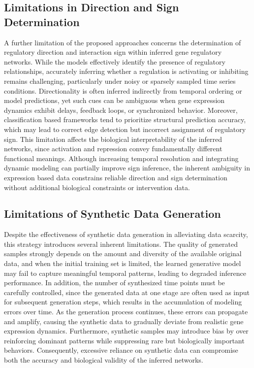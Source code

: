 \subsection{Limitations in Direction and Sign Determination}
A further limitation of the proposed approaches concerns the determination of regulatory direction and interaction sign within inferred gene regulatory networks. While the models effectively identify the presence of regulatory relationships, accurately inferring whether a regulation is activating or inhibiting remains challenging, particularly under noisy or sparsely sampled time series conditions. Directionality is often inferred indirectly from temporal ordering or model predictions, yet such cues can be ambiguous when gene expression dynamics exhibit delays, feedback loops, or synchronized behavior. Moreover, classification based frameworks tend to prioritize structural prediction accuracy, which may lead to correct edge detection but incorrect assignment of regulatory sign. This limitation affects the biological interpretability of the inferred networks, since activation and repression convey fundamentally different functional meanings. Although increasing temporal resolution and integrating dynamic modeling can partially improve sign inference, the inherent ambiguity in expression based data constrains reliable direction and sign determination without additional biological constraints or intervention data.
\subsection{Limitations of Synthetic Data Generation}
Despite the effectiveness of synthetic data generation in alleviating data scarcity, this strategy introduces several inherent limitations. The quality of generated samples strongly depends on the amount and diversity of the available original data, and when the initial training set is limited, the learned generative model may fail to capture meaningful temporal patterns, leading to degraded inference performance. In addition, the number of synthesized time points must be carefully controlled, since the generated data at one stage are often used as input for subsequent generation steps, which results in the accumulation of modeling errors over time. As the generation process continues, these errors can propagate and amplify, causing the synthetic data to gradually deviate from realistic gene expression dynamics. Furthermore, synthetic samples may introduce bias by over reinforcing dominant patterns while suppressing rare but biologically important behaviors. Consequently, excessive reliance on synthetic data can compromise both the accuracy and biological validity of the inferred networks.

